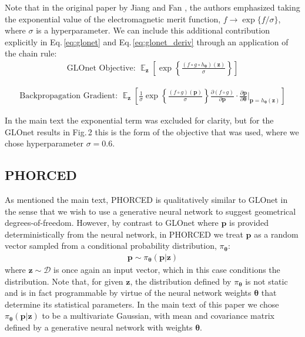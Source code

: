 \documentclass{article}
\DeclareMathOperator*{\EX}{\mathbb{E}}%
\begin{document}
Note that in the original paper by Jiang and Fan \cite{jiang_global_2019,jiang_simulator-based_2020}, the authors emphasized taking the exponential value of the electromagnetic merit function, $f\rightarrow \exp\{f/\sigma\}$, where $\sigma$ is a hyperparameter. We can include this additional contribution explicitly in Eq.\,\eqref{eq:glonet} and Eq.\,\eqref{eq:glonet_deriv} through an application of the chain rule:
\begin{align}
    \boxed{
    \text{GLOnet Objective: }\EX_{\mathbf{z}}\left[\exp \left\{\frac{(f\circ g \circ h_{\boldsymbol{\theta}})(\mathbf{z})}{\sigma}\right\}\right]}\label{eq:glonet_obj_summ}
\end{align}

\begin{align}
    \boxed{
    \text{Backpropagation Gradient: }\EX_\mathbf{z}\left[\frac{1}{\sigma}\exp\left\{\frac{(f\circ g)(\mathbf{p})}{\sigma}\right\}\frac{\partial (f\circ g)}{\partial \mathbf{p}}\cdot\frac{\partial \mathbf{p}}{\partial {\boldsymbol{\theta}}} \bigg|_{\mathbf{p}=h_{\boldsymbol{\theta}}(\mathbf{z})}\right]}
    \label{eq:glonet_deriv_summ}
\end{align}

In the main text the exponential term was excluded for clarity, but for the GLOnet results in Fig.\,2 this is the form of the objective that was used, where we chose hyperparameter $\sigma=0.6$.

\subsection{PHORCED}
As mentioned the main text, PHORCED is qualitatively similar to GLOnet in the sense that we wish to use a generative neural network to suggest geometrical degrees-of-freedom. However, by contrast to GLOnet where $\mathbf{p}$ is provided deterministically from the neural network, in PHORCED we treat $\mathbf{p}$ as a random vector sampled from a conditional probability distribution, $\pi_{\boldsymbol{\theta}}$:
\begin{align}
    \mathbf{p}\sim\pi_{\boldsymbol{\theta}}(\mathbf{p}|\mathbf{z})
\end{align}
where $\mathbf{z}\sim \mathcal{D}$ is once again an input vector, which in this case conditions the distribution. Note that, for given $\mathbf{z}$, the distribution defined by $\pi_{\boldsymbol{\theta}}$ is not static and is in fact programmable by virtue of the neural network weights ${\boldsymbol{\theta}}$ that determine its statistical parameters. In the main text of this paper we chose $\pi_{\boldsymbol{\theta}}(\mathbf{p}|\mathbf{z})$ to be a multivariate Gaussian, with mean and covariance matrix defined by a generative neural network with weights ${\boldsymbol{\theta}}$. 
\end{document}
